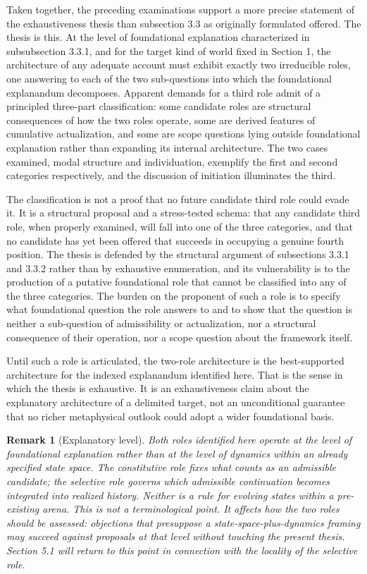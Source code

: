 \documentclass[11pt]{article}
\theoremstyle{foundation}
\newtheorem{remark}{Remark}
\begin{document}
Taken together, the preceding examinations support a more precise statement of the exhaustiveness thesis than subsection 3.3 as originally formulated offered. The thesis is this. At the level of foundational explanation characterized in subsubsection 3.3.1, and for the target kind of world fixed in Section 1, the architecture of any adequate account must exhibit exactly two irreducible roles, one answering to each of the two sub-questions into which the foundational explanandum decomposes. Apparent demands for a third role admit of a principled three-part classification: some candidate roles are structural consequences of how the two roles operate, some are derived features of cumulative actualization, and some are scope questions lying outside foundational explanation rather than expanding its internal architecture. The two cases examined, modal structure and individuation, exemplify the first and second categories respectively, and the discussion of initiation illuminates the third.

The classification is not a proof that no future candidate third role could evade it. It is a structural proposal and a stress-tested schema: that any candidate third role, when properly examined, will fall into one of the three categories, and that no candidate has yet been offered that succeeds in occupying a genuine fourth position. The thesis is defended by the structural argument of subsections 3.3.1 and 3.3.2 rather than by exhaustive enumeration, and its vulnerability is to the production of a putative foundational role that cannot be classified into any of the three categories. The burden on the proponent of such a role is to specify what foundational question the role answers to and to show that the question is neither a sub-question of admissibility or actualization, nor a structural consequence of their operation, nor a scope question about the framework itself.

Until such a role is articulated, the two-role architecture is the best-supported architecture for the indexed explanandum identified here. That is the sense in which the thesis is exhaustive. It is an exhaustiveness claim about the explanatory architecture of a delimited target, not an unconditional guarantee that no richer metaphysical outlook could adopt a wider foundational basis.

\begin{remark}[Explanatory level]
Both roles identified here operate at the level of foundational explanation rather than at the level of dynamics within an already specified state space. The constitutive role fixes what counts as an admissible candidate; the selective role governs which admissible continuation becomes integrated into realized history. Neither is a rule for evolving states within a pre-existing arena. This is not a terminological point. It affects how the two roles should be assessed: objections that presuppose a state-space-plus-dynamics framing may succeed against proposals at that level without touching the present thesis. Section 5.1 will return to this point in connection with the locality of the selective role.
\end{remark}
\end{document}
